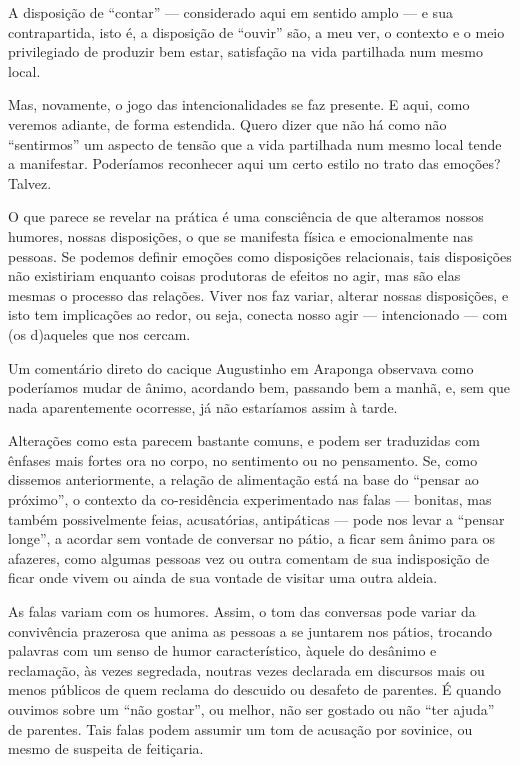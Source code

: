 A disposição de ``contar'' --- considerado aqui em sentido amplo --- e sua
contrapartida, isto é, a disposição de ``ouvir'' são, a meu ver, o contexto
e o meio privilegiado de produzir bem estar, satisfação na vida
partilhada num mesmo local.

Mas, novamente, o jogo das intencionalidades se faz presente. E aqui, como
veremos adiante, de forma estendida. Quero dizer que não há como não
``sentirmos'' um aspecto de tensão que a vida partilhada num mesmo local
tende a manifestar. Poderíamos reconhecer aqui um certo estilo no trato
das emoções? Talvez.

O que parece se revelar na prática é uma consciência de que alteramos
nossos humores, nossas disposições, o que se manifesta física e
emocionalmente nas pessoas. Se podemos definir emoções como disposições
relacionais, tais disposições não existiriam enquanto coisas produtoras
de efeitos no agir, mas são elas mesmas o processo das relações. Viver
nos faz variar, alterar nossas disposições, e isto tem implicações ao
redor, ou seja, conecta nosso agir --- intencionado --- com (os d)aqueles
que nos cercam. 

Um comentário direto do cacique Augustinho em Araponga observava como
poderíamos mudar de ânimo, acordando bem, passando bem a manhã, e, sem
que nada aparentemente ocorresse, já não estaríamos assim à tarde.

Alterações como esta parecem bastante comuns, e podem ser traduzidas com
ênfases mais fortes ora no corpo, no sentimento ou no pensamento. Se,
como dissemos anteriormente, a relação de alimentação está na base do
``pensar ao próximo'', o contexto da co-residência experimentado nas
falas --- bonitas, mas também possivelmente feias, acusatórias,
antipáticas --- pode nos levar a ``pensar longe'', a acordar sem vontade de
conversar no pátio, a ficar sem ânimo para os afazeres, como
algumas pessoas vez ou outra comentam de sua indisposição de ficar onde
vivem ou ainda de sua vontade de visitar uma outra aldeia.

As falas variam com os humores. Assim, o tom das conversas pode variar
da convivência prazerosa que anima as pessoas a se juntarem nos pátios,
trocando palavras com um senso de humor característico, àquele do
desânimo e reclamação, às vezes segredada, noutras vezes declarada em
discursos mais ou menos públicos de quem reclama do descuido ou
desafeto de parentes. É quando ouvimos sobre um ``não gostar'', ou
melhor, não ser gostado ou não ``ter ajuda'' de parentes. Tais falas
podem assumir um tom de acusação por sovinice, ou mesmo de suspeita de
feitiçaria.

